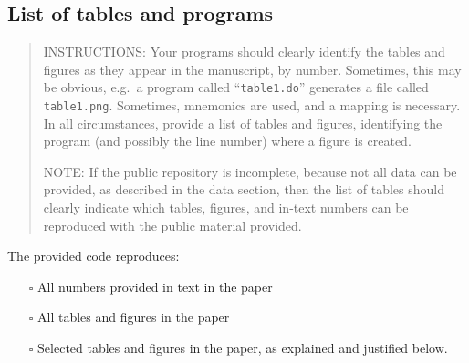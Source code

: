 \documentclass[
]{article}
\providecommand{\tightlist}{%
  \setlength{\itemsep}{0pt}\setlength{\parskip}{0pt}}
\begin{document}
\hypertarget{list-of-tables-and-programs}{%
\subsection{List of tables and
programs}\label{list-of-tables-and-programs}}

\begin{quote}
INSTRUCTIONS: Your programs should clearly identify the tables and
figures as they appear in the manuscript, by number. Sometimes, this may
be obvious, e.g.~a program called ``\texttt{table1.do}'' generates a
file called \texttt{table1.png}. Sometimes, mnemonics are used, and a
mapping is necessary. In all circumstances, provide a list of tables and
figures, identifying the program (and possibly the line number) where a
figure is created.

NOTE: If the public repository is incomplete, because not all data can
be provided, as described in the data section, then the list of tables
should clearly indicate which tables, figures, and in-text numbers can
be reproduced with the public material provided.
\end{quote}

The provided code reproduces:

\begin{itemize}
\tightlist
\item[$\square$]
  All numbers provided in text in the paper
\item[$\square$]
  All tables and figures in the paper
\item[$\square$]
  Selected tables and figures in the paper, as explained and justified
  below.
\end{itemize}
\end{document}
